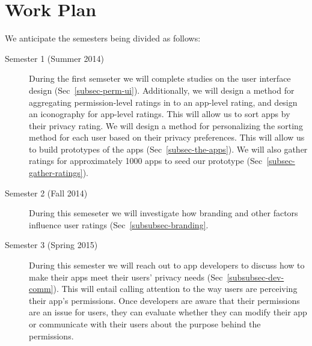 \documentclass[11pt]{article}
\begin{document}
\section{Work Plan}

We anticipate the semesters being divided as
follows:
\begin{description}

\item[Semester 1 (Summer 2014)]
During the first semseter we will complete studies on the user interface design
(Sec~\ref{subsec-perm-ui}). Additionally, we will design a method for aggregating 
permission-level ratings in to an app-level rating, and design an iconography
for app-level ratings. This will allow us to sort apps by their privacy rating.
We will design a method for personalizing the sorting method for each user
based on their privacy preferences.
This will allow us to build prototypes of the 
apps (Sec~\ref{subsec-the-apps}). We will also gather ratings for 
approximately 1000 apps to seed our prototype (Sec~\ref{subsec-gather-ratings}).

\item[Semester 2 (Fall 2014)]
During this semeseter we will investigate how branding and other factors
influence user ratings (Sec~\ref{subsubsec-branding}.

\item[Semester 3 (Spring 2015)] 
During this semester we will reach out to app developers to discuss
how to make their apps meet their users' privacy needs 
(Sec~\ref{subsubsec-dev-comm}). This will entail
calling attention to the way users are perceiving their app's
permissions. Once developers are aware that their permissions are an
issue for users, they can evaluate whether they can modify their app
or communicate with their users about the purpose behind the
permissions.


\end{description}
\end{document}
